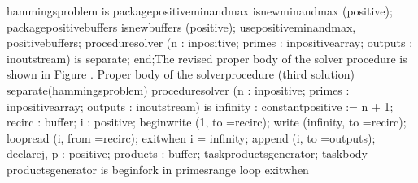 \tyxtstxendbf[] hammings\Symuns[]problem \tyxtstxbf[]is%
\tyxtstxendbf[]
   \tyxtstxbf[]package\tyxtstxendbf[] positive\Symuns[]min\Symuns[]and\Symuns[]max %
\tyxtstxbf[]is\tyxtstxendbf[] \tyxtstxbf[]new\tyxtstxendbf[] min\Symuns[]and\Symuns[]max (positive);
   \tyxtstxbf[]package\tyxtstxendbf[] positive\Symuns[]buffers     %
\tyxtstxbf[]is\tyxtstxendbf[] \tyxtstxbf[]new\tyxtstxendbf[] buffers (positive);
   \tyxtstxbf[]use\tyxtstxendbf[]     positive\Symuns[]min\Symuns[]and\Symuns[]max, positive\Symuns[]buffers;
   \tyxtstxbf[]procedure\tyxtstxendbf[] solver (n       : %
\tyxtstxbf[]in\tyxtstxendbf[]     positive;
                     primes  : \tyxtstxbf[]in\tyxtstxendbf[]     positive\Symuns[]array;
                     outputs : \tyxtstxbf[]in\tyxtstxendbf[] %
\tyxtstxbf[]out\tyxtstxendbf[] stream) \tyxtstxbf[]is%
\tyxtstxendbf[] \tyxtstxbf[]separate\tyxtstxendbf[];
\tyxtstxbf[]end\tyxtstxendbf[];\Endcomp[]
\EndParbox[]
\FgEndblock[]
\Endpara[]
\Para[]The revised proper body of the \tyxffmxmono[]solver%
\tyxffmxendmono[] procedure is shown in Figure .
\FgBlock[]
\Parbox[]
Proper body of the %
\tyxffmxmono[]solver\tyxffmxendmono[] procedure (third solution)%
\FgEndcap[]
\Comp[]\tyxtstxbf[]separate\tyxtstxendbf[] (hammings\Symuns[]problem)
\tyxtstxbf[]procedure\tyxtstxendbf[] solver (n       : %
\tyxtstxbf[]in\tyxtstxendbf[]     positive;
                  primes  : \tyxtstxbf[]in\tyxtstxendbf[]     positive\Symuns[]array;
                  outputs : \tyxtstxbf[]in\tyxtstxendbf[] %
\tyxtstxbf[]out\tyxtstxendbf[] stream) \tyxtstxbf[]is%
\tyxtstxendbf[]
   infinity : \tyxtstxbf[]constant\tyxtstxendbf[] positive := n + 1;
   recirc   : buffer;
   i        : positive;
\tyxtstxbf[]begin\tyxtstxendbf[]
   write (1,        to =\Symgt[] recirc);
   write (infinity, to =\Symgt[] recirc);
   \tyxtstxbf[]loop\tyxtstxendbf[]
      read   (i, from =\Symgt[] recirc);
   \tyxtstxbf[]exit\tyxtstxendbf[] \tyxtstxbf[]when%
\tyxtstxendbf[] i = infinity;
      append (i, to   =\Symgt[] outputs);
      \tyxtstxbf[]declare\tyxtstxendbf[]
         j, p     : positive;
         products : buffer;
         \tyxtstxbf[]task\tyxtstxendbf[] products\Symuns[]generator;
         \tyxtstxbf[]task\tyxtstxendbf[] \tyxtstxbf[]body%
\tyxtstxendbf[] products\Symuns[]generator \tyxtstxbf[]is%
\tyxtstxendbf[]
         \tyxtstxbf[]begin\tyxtstxendbf[]
            \tyxtstxbf[]for\tyxtstxendbf[] k \tyxtstxbf[]in%
\tyxtstxendbf[] primes\rsquo[]range \tyxtstxbf[]loop%
\tyxtstxendbf[]
            \tyxtstxbf[]exit\tyxtstxendbf[] \tyxtstxbf[]when%
